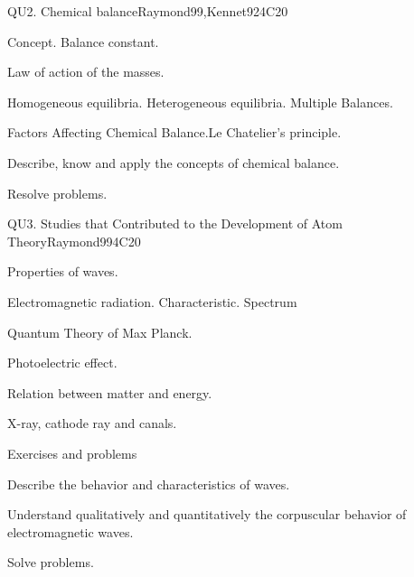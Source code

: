 \begin{syllabus}
\begin{unit}{QU2. Chemical balance}{}{Raymond99,Kennet92}{4}{C20}
\begin{topics}
      \item Concept. Balance constant.
      \item Law of action of the masses.
      \item Homogeneous equilibria. Heterogeneous equilibria. Multiple Balances.
      \item Factors Affecting Chemical Balance.Le Chatelier's principle.
    \end{topics}

   \begin{learningoutcomes}
      \item Describe, know and apply the concepts of chemical balance.
      \item Resolve problems.
   \end{learningoutcomes}
\end{unit}

\begin{unit}{QU3. Studies that Contributed to the Development of Atom Theory}{}{Raymond99}{4}{C20}
\begin{topics}
      \item Properties of waves.
      \item Electromagnetic radiation. Characteristic. Spectrum
      \item Quantum Theory of Max Planck.
      \item Photoelectric effect.
      \item Relation between matter and energy.
      \item X-ray, cathode ray and canals.
      \item Exercises and problems
\end{topics}

   \begin{learningoutcomes}
      \item Describe the behavior and characteristics of waves.
      \item Understand qualitatively and quantitatively the corpuscular behavior of electromagnetic waves.
      \item Solve problems.
   \end{learningoutcomes}
\end{unit}


\end{syllabus}
